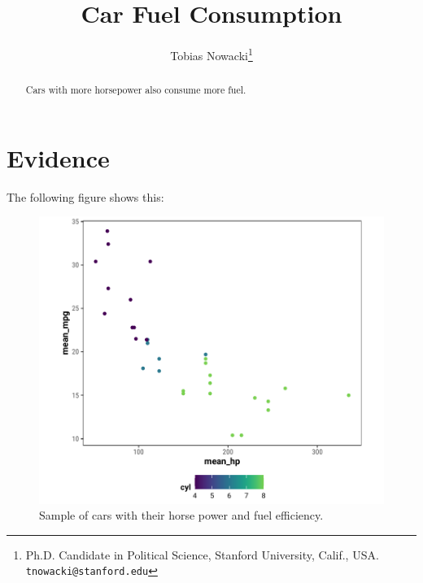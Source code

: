 \documentclass[12pt]{article}
\title{Car Fuel Consumption}
\author{Tobias Nowacki\thanks{Ph.D. Candidate in Political Science, Stanford University, Calif., USA. \texttt{tnowacki@stanford.edu}}}
\begin{document}
\maketitle

\begin{abstract}
Cars with more horsepower also consume more fuel.
\end{abstract}


\doublespacing

\clearpage

\section{Evidence}

The following figure shows this:

\begin{figure}[tb]
  \centering
  \includegraphics[]{output/plot1}
  \caption{Sample of cars with their horse power and fuel efficiency.}
  \label{fig:figure1}
\end{figure}
\end{document}
